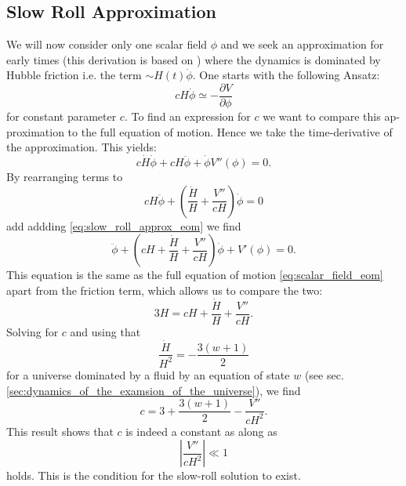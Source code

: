 \documentclass[master,       %
               twoside,        %
               BCOR10mm,       %
               english,ngerman, %
               ]{GAUBM}
\begin{document}
\begin{otherlanguage}{english}
\subsection{Slow Roll Approximation}
\label{sec:slow_roll_approximation}
We will now consider only one scalar field $\phi$ and we seek an approximation for early times (this derivation is based on \cite[appendix A]{early_scalar_field_dynamics_PhysRevD.84.123506}) where the dynamics is dominated by Hubble friction i.e. the term $\sim H(t) \dot{\phi}$.
One starts with the following Ansatz:
\begin{equation}
	\label{eq:slow_roll_approx_eom}
	c H \dot{\phi} \simeq - \frac{\partial V}{\partial \phi}
\end{equation}
for constant parameter $c$.
To find an expression for $c$ we want to compare this approximation to the full equation of motion. Hence we take the time-derivative of the approximation. This yields:
\begin{equation}
	c \dot{H} \dot{\phi} + c H \ddot{\phi} + \dot{\phi} V''(\phi) = 0.
\end{equation}
By rearranging terms to
\begin{equation}
	c H \ddot{\phi} + \left(\frac{\dot{H}}{H} + \frac{V''}{c H}\right) \dot{\phi} = 0
\end{equation}
add addding \eqref{eq:slow_roll_approx_eom} we find
\begin{equation}
	\ddot{\phi} + \left( cH + \frac{\dot{H}}{H} + \frac{V''}{c H} \right) \dot{\phi} + V'(\phi) = 0.
\end{equation}
This equation is the same as the full equation of motion \eqref{eq:scalar_field_eom} apart from the friction term,
which allows us to compare the two:
\begin{equation}
	3 H = c H + \frac{\dot{H}}{H} + \frac{V''}{c H}.
\end{equation}
Solving for $c$ and using that
\begin{equation}
	\frac{\dot{H}}{H^2} = - \frac{3(w + 1)}{2}
\end{equation}
for a universe dominated by a fluid by an equation of state $w$ (see sec. \ref{sec:dynamics_of_the_examsion_of_the_universe}), we find
\begin{equation}
	c = 3 +\frac{3(w + 1)}{2} - \frac{V''}{c H^2}.
\end{equation}
This result shows that $c$ is indeed a constant as along as
\begin{equation}
	\label{eq:slow_roll_condition}
	\left| \frac{V''}{c H^2} \right| \ll 1
\end{equation}
holds. This is the condition for the slow-roll solution to exist.


\end{otherlanguage}
\end{document}
